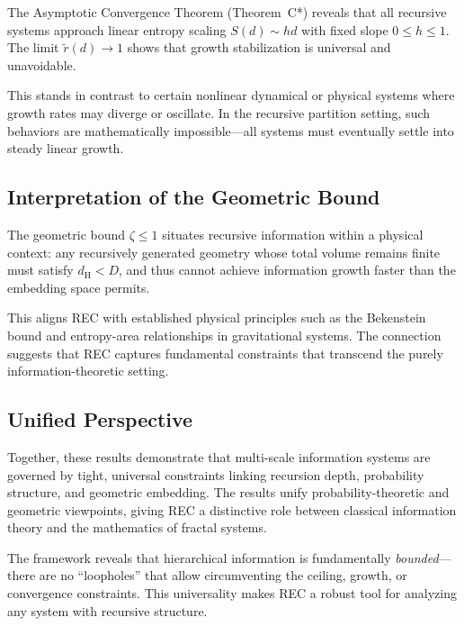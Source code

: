 \documentclass[11pt,a4paper]{article}
\theoremstyle{definition}
\theoremstyle{remark}
\newcommand{\dH}{d_{\mathrm{H}}}
\newcommand{\rtilde}{\tilde{r}}
\begin{document}
The Asymptotic Convergence Theorem (Theorem~C*) reveals that all recursive
systems approach linear entropy scaling $S(d)\sim h d$ with fixed slope
$0 \le h \le 1$. The limit $\rtilde(d)\to1$ shows that growth stabilization
is universal and unavoidable. 

This stands in contrast to certain nonlinear 
dynamical or physical systems where growth rates may diverge or oscillate.
In the recursive partition setting, such behaviors are mathematically 
impossible---all systems must eventually settle into steady linear growth.

\subsection{Interpretation of the Geometric Bound}

The geometric bound $\zeta \le 1$ situates recursive information 
within a physical context: any recursively generated geometry whose total 
volume remains finite must satisfy $\dH < D$, and thus cannot achieve 
information growth faster than the embedding space permits. 

This aligns REC with established physical principles such as the Bekenstein 
bound and entropy-area relationships in gravitational systems. The connection
suggests that REC captures fundamental constraints that transcend the purely
information-theoretic setting.

\subsection{Unified Perspective}

Together, these results demonstrate that multi-scale information systems are 
governed by tight, universal constraints linking recursion depth, probability
structure, and geometric embedding. The results unify probability-theoretic 
and geometric viewpoints, giving REC a distinctive role between classical 
information theory and the mathematics of fractal systems.

The framework reveals that hierarchical information is fundamentally 
\emph{bounded}---there are no ``loopholes'' that allow circumventing
the ceiling, growth, or convergence constraints. This universality
makes REC a robust tool for analyzing any system with recursive structure.

\end{document}
